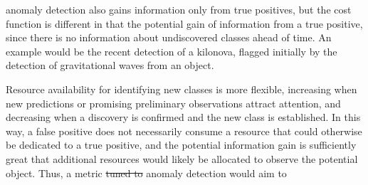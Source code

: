 \label{sec:anom}
 anomaly detection also gains information only from true positives, but the cost function is different in that the potential gain of information from a true positive, since there is no information about undiscovered classes ahead of time.
An example would be the recent detection of a kilonova, flagged initially by the detection of gravitational waves from an object.

Resource availability for identifying new classes is more flexible, increasing when new predictions or promising preliminary observations attract attention, and decreasing when a discovery is confirmed and the new class is established.
In this way, a false positive does not necessarily consume a resource that could otherwise be dedicated to a true positive, and the potential information gain is sufficiently great that additional resources would likely be allocated to observe the potential object.
Thus, a metric \sout{tuned to}  anomaly detection would aim to 

%

